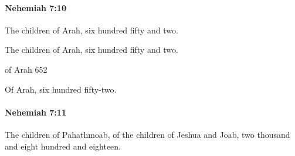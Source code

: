 		\paragraph{Nehemiah 7:10} %
			\label{NEHEMIAH-7-10}

			The children of Arah, six hundred fifty and two.

			\begin{versebox}
					\item[BHS] 
					\item[LXX] 
					\item[ASV] The children of Arah, six hundred fifty and two.
					\item[NIV] of Arah 652
					\item[NRSV] Of Arah, six hundred fifty-two.
			\end{versebox}

		\paragraph{Nehemiah 7:11} %
			\label{NEHEMIAH-7-11}

			The children of Pahathmoab, of the children of Jeshua and Joab, two thousand and eight hundred and eighteen.

